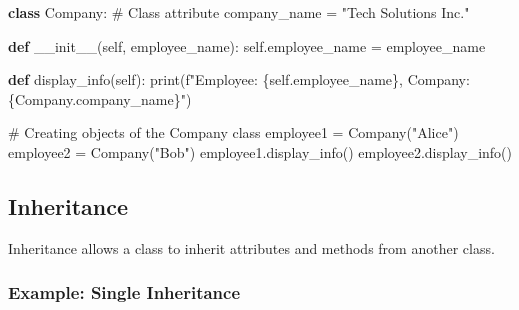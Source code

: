 \documentclass[
  letterpaper,
  DIV=11,
  numbers=noendperiod]{scrreprt}
\newenvironment{Shaded}{\begin{snugshade}}{\end{snugshade}}
\newcommand{\BuiltInTok}[1]{\textcolor[rgb]{0.00,0.23,0.31}{#1}}
\newcommand{\CommentTok}[1]{\textcolor[rgb]{0.37,0.37,0.37}{#1}}
\newcommand{\FunctionTok}[1]{\textcolor[rgb]{0.28,0.35,0.67}{#1}}
\newcommand{\KeywordTok}[1]{\textcolor[rgb]{0.00,0.23,0.31}{\textbf{#1}}}
\newcommand{\NormalTok}[1]{\textcolor[rgb]{0.00,0.23,0.31}{#1}}
\newcommand{\OperatorTok}[1]{\textcolor[rgb]{0.37,0.37,0.37}{#1}}
\newcommand{\SpecialCharTok}[1]{\textcolor[rgb]{0.37,0.37,0.37}{#1}}
\newcommand{\SpecialStringTok}[1]{\textcolor[rgb]{0.13,0.47,0.30}{#1}}
\newcommand{\StringTok}[1]{\textcolor[rgb]{0.13,0.47,0.30}{#1}}
\newcommand{\VariableTok}[1]{\textcolor[rgb]{0.07,0.07,0.07}{#1}}
\begin{document}
\begin{Shaded}
\begin{Highlighting}[]
\KeywordTok{class}\NormalTok{ Company:}
    \CommentTok{\# Class attribute}
\NormalTok{    company\_name }\OperatorTok{=} \StringTok{"Tech Solutions Inc."}
    
    \KeywordTok{def} \FunctionTok{\_\_init\_\_}\NormalTok{(}\VariableTok{self}\NormalTok{, employee\_name):}
        \VariableTok{self}\NormalTok{.employee\_name }\OperatorTok{=}\NormalTok{ employee\_name}
    
    \KeywordTok{def}\NormalTok{ display\_info(}\VariableTok{self}\NormalTok{):}
        \BuiltInTok{print}\NormalTok{(}\SpecialStringTok{f"Employee: }\SpecialCharTok{\{}\VariableTok{self}\SpecialCharTok{.}\NormalTok{employee\_name}\SpecialCharTok{\}}\SpecialStringTok{, Company: }\SpecialCharTok{\{}\NormalTok{Company}\SpecialCharTok{.}\NormalTok{company\_name}\SpecialCharTok{\}}\SpecialStringTok{"}\NormalTok{)}

\CommentTok{\# Creating objects of the Company class}
\NormalTok{employee1 }\OperatorTok{=}\NormalTok{ Company(}\StringTok{"Alice"}\NormalTok{)}
\NormalTok{employee2 }\OperatorTok{=}\NormalTok{ Company(}\StringTok{"Bob"}\NormalTok{)}
\NormalTok{employee1.display\_info()  }
\NormalTok{employee2.display\_info() }
\end{Highlighting}
\end{Shaded}

\subsection{Inheritance}\label{inheritance}

Inheritance allows a class to inherit attributes and methods from
another class.

\subsubsection{Example: Single
Inheritance}\label{example-single-inheritance}
\end{document}
